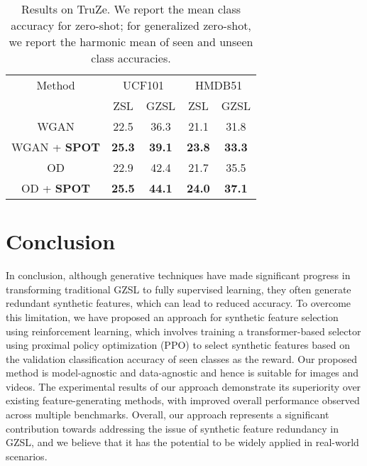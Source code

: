 \documentclass[10pt,twocolumn,letterpaper]{article}
\begin{document}
\begin{table}[t]
\small
\begin{center}
\begin{tabular}{| *{5}{c|} }
\hline
Method & \multicolumn{2}{c|}{UCF101 } & \multicolumn{2}{c|}{HMDB51}\\
  & ZSL & GZSL  & ZSL & GZSL \\
 \hline\hline
WGAN  & 22.5 & 36.3  & 21.1 & 31.8 \\
WGAN + \textbf{SPOT} & \textbf{25.3} & \textbf{39.1} & \textbf{23.8} & \textbf{33.3} \\
\hline
OD & 22.9 & 42.4  & 21.7 & 35.5 \\
OD + \textbf{SPOT}  & \textbf{25.5} & \textbf{44.1} & \textbf{24.0} & \textbf{37.1} \\
\hline
\end{tabular}
\end{center}
\caption{Results on TruZe. We report the mean class accuracy for zero-shot; for generalized zero-shot, we report the harmonic mean of seen and unseen class accuracies. }
\label{tbl:truze}
\end{table}

\section{Conclusion}
\label{sec:conclusion}

In conclusion, although generative techniques have made significant progress in transforming traditional GZSL to fully supervised learning, they often generate redundant synthetic features, which can lead to reduced accuracy. To overcome this limitation, we have proposed an approach for synthetic feature selection using reinforcement learning, which involves training a transformer-based selector using proximal policy optimization (PPO) to select synthetic features based on the validation classification accuracy of seen classes as the reward. Our proposed method is model-agnostic and data-agnostic and hence is suitable for images and videos. The experimental results of our approach demonstrate its superiority over existing feature-generating methods, with improved overall performance observed across multiple benchmarks. Overall, our approach represents a significant contribution towards addressing the issue of synthetic feature redundancy in GZSL, and we believe that it has the potential to be widely applied in real-world scenarios.

{\small


}
\end{document}
